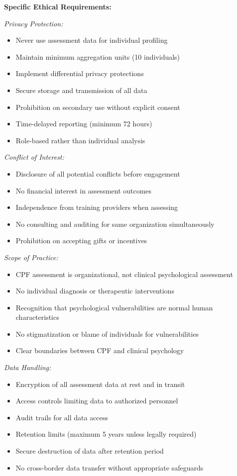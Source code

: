 \documentclass[11pt,a4paper]{article}
\begin{document}
\textbf{Specific Ethical Requirements:}

\textit{Privacy Protection:}
\begin{itemize}
\item Never use assessment data for individual profiling
\item Maintain minimum aggregation units (10 individuals)
\item Implement differential privacy protections
\item Secure storage and transmission of all data
\item Prohibition on secondary use without explicit consent
\item Time-delayed reporting (minimum 72 hours)
\item Role-based rather than individual analysis
\end{itemize}

\textit{Conflict of Interest:}
\begin{itemize}
\item Disclosure of all potential conflicts before engagement
\item No financial interest in assessment outcomes
\item Independence from training providers when assessing
\item No consulting and auditing for same organization simultaneously
\item Prohibition on accepting gifts or incentives
\end{itemize}

\textit{Scope of Practice:}
\begin{itemize}
\item CPF assessment is organizational, not clinical psychological assessment
\item No individual diagnosis or therapeutic interventions
\item Recognition that psychological vulnerabilities are normal human characteristics
\item No stigmatization or blame of individuals for vulnerabilities
\item Clear boundaries between CPF and clinical psychology
\end{itemize}

\textit{Data Handling:}
\begin{itemize}
\item Encryption of all assessment data at rest and in transit
\item Access controls limiting data to authorized personnel
\item Audit trails for all data access
\item Retention limits (maximum 5 years unless legally required)
\item Secure destruction of data after retention period
\item No cross-border data transfer without appropriate safeguards
\end{itemize}
\end{document}
